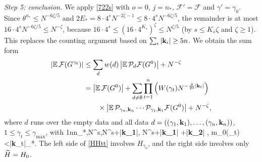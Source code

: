 {\it Step 5: conclusion.} We apply \eqref{722s} with $o=0$, $j=n_*$, $\mathcal F'=\mathcal F$ and $\gamma'=\gamma_0$. Since $\theta^{n_*}\le N^{-6\zeta/5}$ and $2E_*=8\cdot4^sN^{-2\zeta-1}\le8\cdot4^sN^{-6\zeta/5}$, the remainder is at most $16\cdot4^sN^{-6\zeta/5}\le N^{-\zeta}$, because $16\cdot4^s\le(16\cdot4^{K_s})^{\zeta}\le N^{\zeta/5}$ (by $s\le K_s\zeta$ and $\zeta\ge1$). This replaces the counting argument based on $\sum_i|{\bf k}_i|\ge5n$. We obtain the sum form
\begin{equation} \label{HHtt}
\begin{split}
\left|\mathbb{E}\,\mathcal F(G^{\gamma_0})\right|
&\leq \sum_{d}w(d)\left|\mathbb{E}\,\mathcal P_d\mathcal F(G^0)\right|+N^{-\zeta}\\
&=\left|\mathbb{E}\,\mathcal F(G^0)\right|+\sum_{d\ne\emptyset}\prod_{t=1}^n\Big(W(\gamma_t)N^{-\frac{\phi}{20}|{\bf k}_t|}\Big)\\
&\qquad\times\left|\mathbb{E}\,\mathcal P_{\gamma_n,{\bf k}_n}\cdots\mathcal P_{\gamma_1,{\bf k}_1}\mathcal F(G^0)\right|+N^{-\zeta},
\end{split}
\end{equation}
where $d$ runs over the empty data and all data $d=((\gamma_1,{\bf k}_1),\dots,(\gamma_n,{\bf k}_n))$, $1\le\gamma_t\le\gamma_{\max}$, with
\be\label{conK}
1\le n\leq n_*,\in \mathbb N^s,\in \mathbb N^{s+|{\bf k_1}|}, \in \mathbb N^{s+|{\bf k_1}| +|{\bf k_2}|} , \quad m_0(\gamma_t)<|{\bf k}_t|\leq \xi_*.
\ee
The left side of \eqref{HHtt} involves $H_{\gamma_0}$, and the right side involves only $\widetilde H=H_0$.

